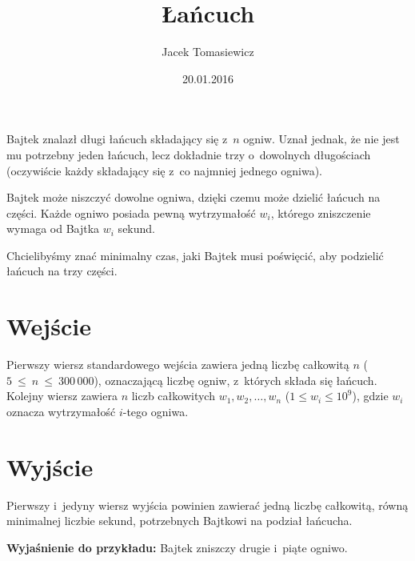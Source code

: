 \documentclass[zad,zawodnik,utf8]{sinol}
\title{Łańcuch}
\author{Jacek Tomasiewicz} %
\date{20.01.2016}
\begin{document}
  \begin{tasktext}%
    Bajtek znalazł długi łańcuch składający się z~$n$ ogniw.
    Uznał jednak, że nie jest mu potrzebny jeden łańcuch,
    lecz dokładnie trzy o~dowolnych długościach (oczywiście każdy składający się z~co najmniej jednego ogniwa).

Bajtek może niszczyć dowolne ogniwa, dzięki czemu może dzielić łańcuch na części.
    Każde ogniwo posiada pewną wytrzymałość $w_i$, którego zniszczenie wymaga od Bajtka $w_i$ sekund.

    Chcielibyśmy znać minimalny czas, jaki Bajtek musi poświęcić, aby podzielić łańcuch na trzy części.

    \section{Wejście}
      Pierwszy wiersz standardowego wejścia zawiera jedną liczbę całkowitą $n$ ($5~\leq~n~\leq~300\,000$),
      oznaczającą liczbę ogniw, z~których składa się łańcuch.
      Kolejny wiersz zawiera $n$ liczb całkowitych $w_1, w_2, \ldots, w_n$ ($1 \leq w_i \leq 10^9$),
      gdzie $w_i$ oznacza wytrzymałość $i$-tego ogniwa.

    \section{Wyjście}
      Pierwszy i~jedyny wiersz wyjścia powinien zawierać jedną liczbę całkowitą,
      równą minimalnej liczbie sekund, potrzebnych Bajtkowi na podział łańcucha.

    \makecompactexample

  \medskip
  \noindent
  \textbf{Wyjaśnienie do przykładu:} 
  Bajtek zniszczy drugie i~piąte ogniwo.

  \end{tasktext}
\end{document}
